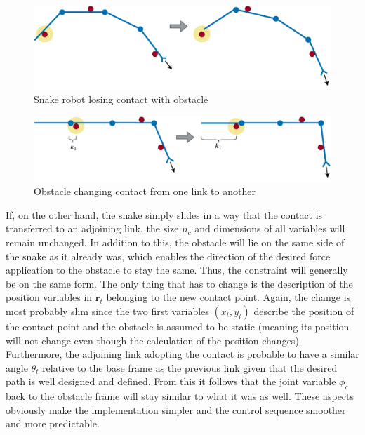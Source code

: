 \begin{figure}
    \centering
    \includegraphics[width=\textwidth]{figures/theory/obst_slide_sequence1.pdf}
    \caption{Snake robot losing contact with obstacle}
    \label{fig:obst_slide_seq1}
\end{figure}

\begin{figure}
    \centering
    \includegraphics[width=\textwidth]{figures/theory/obst_slide_sequence2.pdf}
    \caption{Obstacle changing contact from one link to another}
    \label{fig:obst_slide_seq2}
\end{figure}

If, on the other hand, the snake simply slides in a way that the contact is transferred to an adjoining link, the size $n_c$ and dimensions of all variables will remain unchanged. In addition to this, the obstacle will lie on the same side of the snake as it already was, which enables the direction of the desired force application to the obstacle to stay the same. Thus, the constraint will generally be on the same form. The only thing that has to change is the description of the position variables in $\mathbf{r}_t$ belonging to the new contact point. Again, the change is most probably slim since the two first variables $(x_t, y_t)$ describe the position of the contact point and the obstacle is assumed to be static (meaning its position will not change even though the calculation of the position changes). Furthermore, the adjoining link adopting the contact is probable to have a similar angle $\theta_t$ relative to the base frame as the previous link given that the desired path is well designed and defined. From this it follows that the joint variable $\phi_c$ back to the obstacle frame will stay similar to what it was as well. These aspects obviously make the implementation simpler and the control sequence smoother and more predictable.

